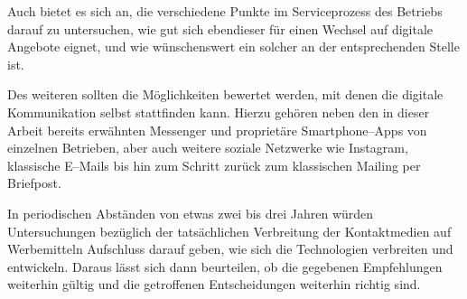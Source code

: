 Auch bietet es sich an, die verschiedene Punkte im Serviceprozess des Betriebs darauf zu untersuchen, wie gut sich ebendieser für einen Wechsel auf digitale Angebote eignet, und wie wünschenswert ein solcher an der entsprechenden Stelle ist.

Des weiteren sollten die Möglichkeiten bewertet werden, mit denen die digitale Kommunikation selbst stattfinden kann. Hierzu gehören neben den in dieser Arbeit bereits erwähnten Messenger und proprietäre Smartphone–Apps von einzelnen Betrieben, aber auch weitere soziale Netzwerke wie Instagram, klassische E–Mails bis hin zum Schritt zurück zum klassischen Mailing per Briefpost. 

In periodischen Abständen von etwas zwei bis drei Jahren würden Untersuchungen bezüglich der tatsächlichen Verbreitung der Kontaktmedien auf Werbemitteln Aufschluss darauf geben, wie sich die Technologien verbreiten und entwickeln. Daraus lässt sich dann beurteilen, ob die gegebenen Empfehlungen weiterhin gültig und die getroffenen Entscheidungen weiterhin richtig sind.
